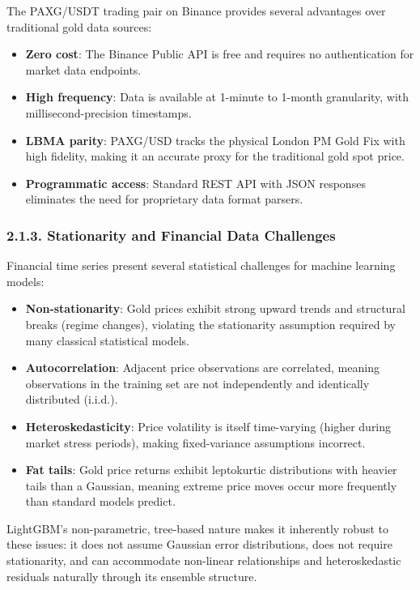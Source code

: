 The PAXG/USDT trading pair on Binance provides several advantages over traditional gold data sources:
\begin{itemize}
  \item \textbf{Zero cost}: The Binance Public API is free and requires no authentication for market data endpoints.
  \item \textbf{High frequency}: Data is available at 1-minute to 1-month granularity, with millisecond-precision timestamps.
  \item \textbf{LBMA parity}: PAXG/USD tracks the physical London PM Gold Fix with high fidelity, making it an accurate proxy for the traditional gold spot price.
  \item \textbf{Programmatic access}: Standard REST API with JSON responses eliminates the need for proprietary data format parsers.
\end{itemize}

\subsubsection{2.1.3. Stationarity and Financial Data Challenges}
Financial time series present several statistical challenges for machine learning models:

\begin{itemize}
  \item \textbf{Non-stationarity}: Gold prices exhibit strong upward trends and structural breaks (regime changes), violating the stationarity assumption required by many classical statistical models.
  \item \textbf{Autocorrelation}: Adjacent price observations are correlated, meaning observations in the training set are not independently and identically distributed (i.i.d.).
  \item \textbf{Heteroskedasticity}: Price volatility is itself time-varying (higher during market stress periods), making fixed-variance assumptions incorrect.
  \item \textbf{Fat tails}: Gold price returns exhibit leptokurtic distributions with heavier tails than a Gaussian, meaning extreme price moves occur more frequently than standard models predict.
\end{itemize}

LightGBM's non-parametric, tree-based nature makes it inherently robust to these issues: it does not assume Gaussian error distributions, does not require stationarity, and can accommodate non-linear relationships and heteroskedastic residuals naturally through its ensemble structure.

